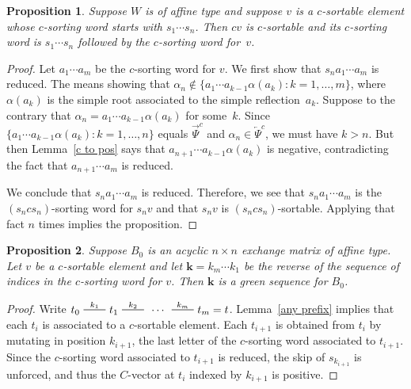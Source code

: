 \documentclass{amsart}
\newtheorem{proposition}{Proposition}[section]
\theoremstyle{definition}
\theoremstyle{remark}
\numberwithin{equation}{section}
\newcommand{\edge}{\,\,\rule[2.7pt]{20pt}{0.5pt}\,\,}
\newcommand{\set}[1]{{\lbrace #1 \rbrace}}
\newcommand{\0}{{\mathbf{0}}}
\newcommand{\kk}{{\boldsymbol{k}}}
\newcommand{\TravInfChar}{\Psi}
\newcommand{\TravProj}[1]{\overrightarrow{\TravInfChar}^{#1}}
\newcommand{\TravInj}[1]{\overleftarrow{\TravInfChar}^{#1}}
\begin{document}
\begin{proposition}\label{tack on c}
Suppose $W$ is of affine type and suppose $v$ is a $c$-sortable element whose $c$-sorting word starts with $s_1\cdots s_n$.
Then $cv$ is $c$-sortable and its $c$-sorting word is $s_1\cdots s_n$ followed by the $c$-sorting word for~$v$.
\end{proposition}
\begin{proof}
Let $a_1\cdots a_m$ be the $c$-sorting word for $v$.
We first show that $s_na_1\cdots a_m$ is reduced.
  The means showing that $\alpha_n\not\in\set{a_1\cdots a_{k-1}\alpha(a_k):k=1,\ldots,m}$, where $\alpha(a_k)$ is the simple root associated to the simple reflection~$a_k$.
Suppose to the contrary that $\alpha_n=a_1\cdots a_{k-1}\alpha(a_k)$ for some~$k$.
Since $\set{a_1\cdots a_{k-1}\alpha(a_k):k=1,\ldots,n}$ equals $\TravProj{c}$ and $\alpha_n\in \TravInj{c}$, we must have $k>n$.
But then Lemma~\ref{c to pos} says that $a_{n+1}\cdots a_{k-1}\alpha(a_k)$ is negative, contradicting the fact that $a_{n+1}\cdots a_m$ is reduced.

We conclude that $s_na_1\cdots a_m$ is reduced.
Therefore, we see that $s_na_1\cdots a_m$ is the $(s_ncs_n)$-sorting word for $s_nv$ and that $s_nv$ is $(s_ncs_n)$-sortable.
Applying that fact $n$ times implies the proposition.
\end{proof}

\begin{proposition}\label{sort green}
Suppose $B_0$ is an acyclic $n\times n$ exchange matrix of affine type.
Let $v$ be a $c$-sortable element and let $\kk=k_m\cdots k_1$ be the \emph{reverse} of the sequence of indices in the $c$-sorting word for $v$.
Then $\kk$ is a green sequence for $B_0$.
\end{proposition}
\begin{proof}
Write $t_0\overset{k_1}{\edge}t_1\overset{k_2}{\edge}\,\cdots\,\overset{k_m}{\edge}t_m=t$.
Lemma~\ref{any prefix} implies that each $t_i$ is associated to a $c$-sortable element.
Each $t_{i+1}$ is obtained from $t_i$ by mutating in position $k_{i+1}$, the last letter of the $c$-sorting word associated to $t_{i+1}$.
Since the $c$-sorting word associated to $t_{i+1}$ is reduced, the skip of $s_{k_{i+1}}$ is unforced, and thus the $C$-vector at $t_i$ indexed by $k_{i+1}$ is positive.
\end{proof}
\end{document}
